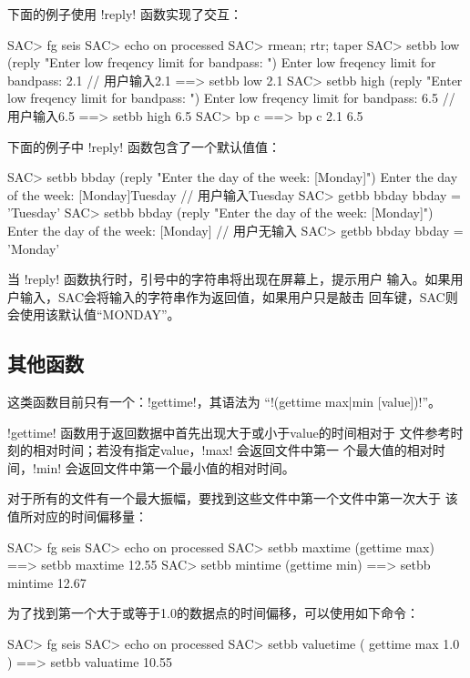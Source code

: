 下面的例子使用 !reply! 函数实现了交互：
\begin{SACCode}
SAC> fg seis
SAC> echo on processed
SAC> rmean; rtr; taper
SAC> setbb low (reply "Enter low freqency limit for bandpass: ")
Enter low freqency limit for bandpass: 2.1          // 用户输入2.1
 ==>  setbb low 2.1
SAC> setbb high (reply "Enter low freqency limit for bandpass: ")
Enter low freqency limit for bandpass: 6.5          // 用户输入6.5
 ==>  setbb high 6.5
SAC> bp c %
 ==>  bp c 2.1 6.5
\end{SACCode}

下面的例子中 !reply! 函数包含了一个默认值值：
\begin{SACCode}
SAC> setbb bbday (reply "Enter the day of the week: [Monday]")
Enter the day of the week: [Monday]Tuesday      // 用户输入Tuesday
SAC> getbb bbday
 bbday = 'Tuesday'
SAC> setbb bbday (reply "Enter the day of the week: [Monday]")
Enter the day of the week: [Monday]             // 用户无输入
SAC> getbb bbday
 bbday = 'Monday'
\end{SACCode}
当 !reply! 函数执行时，引号中的字符串将出现在屏幕上，提示用户
输入。如果用户输入，SAC会将输入的字符串作为返回值，如果用户只是敲击
回车键，SAC则会使用该默认值``MONDAY''。

\subsection{其他函数}
这类函数目前只有一个：!gettime!，其语法为
``!(gettime max|min [value])!''。

!gettime! 函数用于返回数据中首先出现大于或小于value的时间相对于
文件参考时刻的相对时间；若没有指定value，!max! 会返回文件中第一
个最大值的相对时间，!min! 会返回文件中第一个最小值的相对时间。

对于所有的文件有一个最大振幅，要找到这些文件中第一个文件中第一次大于
该值所对应的时间偏移量：
\begin{SACCode}
SAC> fg seis
SAC> echo on processed
SAC> setbb maxtime (gettime max)
 ==>  setbb maxtime 12.55
SAC> setbb mintime (gettime min)
 ==>  setbb mintime 12.67
\end{SACCode}

为了找到第一个大于或等于1.0的数据点的时间偏移，可以使用如下命令：
\begin{SACCode}
SAC> fg seis
SAC> echo on processed
SAC> setbb valuetime ( gettime max 1.0 )
 ==> setbb valuatime 10.55
\end{SACCode}
